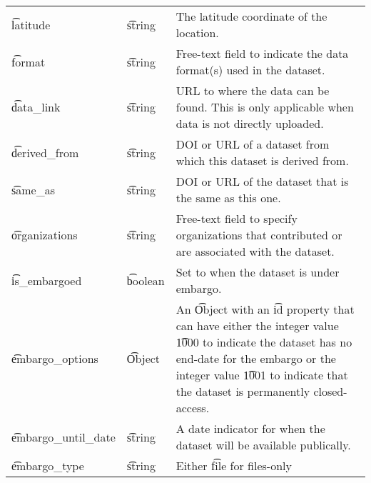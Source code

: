 \begin{tabularx}{\textwidth}{*{2}{!{\VRule[-1pt]}l}!{\VRule[-1pt]}X}
  \t{latitude}       & \t{string}           & The latitude coordinate of the
                                              location.\\
  \t{format}         & \t{string}           & Free-text field to indicate the
                                              data format(s) used in the
                                              dataset.\\
  \t{data\_link}     & \t{string}           & URL to where the data can be
                                              found.  This is only applicable
                                              when data is not directly
                                              uploaded.\\
  \t{derived\_from}  & \t{string}           & DOI or URL of a dataset from
                                              which this dataset is derived
                                              from.\\
  \t{same\_as}       & \t{string}           & DOI or URL of the dataset that
                                              is the same as this one.\\
  \t{organizations}  & \t{string}           & Free-text field to specify
                                              organizations that contributed
                                              or are associated with the
                                              dataset.\\
  \t{is\_embargoed}  & \t{boolean}          & Set to  when the
                                              dataset is under embargo.\\
  \t{embargo\_options} & \t{Object}         & An \t{Object} with an \t{id}
                                              property that can have either
                                              the integer value \t{1000} to
                                              indicate the dataset has no
                                              end-date for the embargo or the
                                              integer value \t{1001} to indicate
                                              that the dataset is permanently
                                              closed-access.\\
  \t{embargo\_until\_date} & \t{string}     & A date indicator for when the
                                              dataset will be available
                                              publically.\\
  \t{embargo\_type}  & \t{string}           & Either \t{file} for files-only

\end{tabularx}
